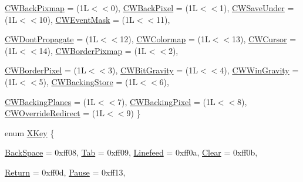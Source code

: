 \begin{DoxyCompactItemize}
\hyperlink{namespace_tao_1_1_platform_1_1_x11_ad5522246b4d14bdf01cdeccf2b0b1e90}{CWBackPixmap} =  (1L$<$$<$0), 
\hyperlink{namespace_tao_1_1_platform_1_1_x11_ad5522246b4d14bdf01cdeccf2b0b1e90}{CWBackPixel} =  (1L$<$$<$1), 
\hyperlink{namespace_tao_1_1_platform_1_1_x11_ad5522246b4d14bdf01cdeccf2b0b1e90}{CWSaveUnder} =  (1L$<$$<$10), 
\hyperlink{namespace_tao_1_1_platform_1_1_x11_ad5522246b4d14bdf01cdeccf2b0b1e90}{CWEventMask} =  (1L$<$$<$11), 
\par
\hyperlink{namespace_tao_1_1_platform_1_1_x11_ad5522246b4d14bdf01cdeccf2b0b1e90}{CWDontPropagate} =  (1L$<$$<$12), 
\hyperlink{namespace_tao_1_1_platform_1_1_x11_ad5522246b4d14bdf01cdeccf2b0b1e90}{CWColormap} =  (1L$<$$<$13), 
\hyperlink{namespace_tao_1_1_platform_1_1_x11_ad5522246b4d14bdf01cdeccf2b0b1e90}{CWCursor} =  (1L$<$$<$14), 
\hyperlink{namespace_tao_1_1_platform_1_1_x11_ad5522246b4d14bdf01cdeccf2b0b1e90}{CWBorderPixmap} =  (1L$<$$<$2), 
\par
\hyperlink{namespace_tao_1_1_platform_1_1_x11_ad5522246b4d14bdf01cdeccf2b0b1e90}{CWBorderPixel} =  (1L$<$$<$3), 
\hyperlink{namespace_tao_1_1_platform_1_1_x11_ad5522246b4d14bdf01cdeccf2b0b1e90}{CWBitGravity} =  (1L$<$$<$4), 
\hyperlink{namespace_tao_1_1_platform_1_1_x11_ad5522246b4d14bdf01cdeccf2b0b1e90}{CWWinGravity} =  (1L$<$$<$5), 
\hyperlink{namespace_tao_1_1_platform_1_1_x11_ad5522246b4d14bdf01cdeccf2b0b1e90}{CWBackingStore} =  (1L$<$$<$6), 
\par
\hyperlink{namespace_tao_1_1_platform_1_1_x11_ad5522246b4d14bdf01cdeccf2b0b1e90}{CWBackingPlanes} =  (1L$<$$<$7), 
\hyperlink{namespace_tao_1_1_platform_1_1_x11_ad5522246b4d14bdf01cdeccf2b0b1e90}{CWBackingPixel} =  (1L$<$$<$8), 
\hyperlink{namespace_tao_1_1_platform_1_1_x11_ad5522246b4d14bdf01cdeccf2b0b1e90}{CWOverrideRedirect} =  (1L$<$$<$9)
 \}
\item 
enum \hyperlink{namespace_tao_1_1_platform_1_1_x11_af45775970b5b14a75b9f7781400eb88a}{XKey} \{ \par
\hyperlink{namespace_tao_1_1_platform_1_1_x11_af45775970b5b14a75b9f7781400eb88a}{BackSpace} =  0xff08, 
\hyperlink{namespace_tao_1_1_platform_1_1_x11_af45775970b5b14a75b9f7781400eb88a}{Tab} =  0xff09, 
\hyperlink{namespace_tao_1_1_platform_1_1_x11_af45775970b5b14a75b9f7781400eb88a}{Linefeed} =  0xff0a, 
\hyperlink{namespace_tao_1_1_platform_1_1_x11_af45775970b5b14a75b9f7781400eb88a}{Clear} =  0xff0b, 
\par
\hyperlink{namespace_tao_1_1_platform_1_1_x11_af45775970b5b14a75b9f7781400eb88a}{Return} =  0xff0d, 
\hyperlink{namespace_tao_1_1_platform_1_1_x11_af45775970b5b14a75b9f7781400eb88a}{Pause} =  0xff13, 
$$
\end{DoxyCompactItemize}
